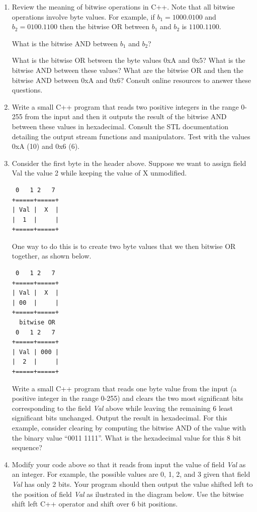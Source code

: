 \documentclass[12pt]{book}
\begin{document}
\begin{enumerate}[resume*]
\item Review the meaning of bitwise operations in C++. Note that all bitwise operations involve byte values. For example, if $b_1 = 1000.0100$ and $b_2 = 0100.1100$ then the bitwise OR between $b_1$ and $b_2$ is $1100.1100$.

  What is the bitwise AND between $b_1$ and $b_2$?

  What is the bitwise OR between the byte values 0xA and 0x5? What is the bitwise AND between these values? What are the bitwise OR and then the bitwise AND between 0xA and 0x6? Consult online resources to answer these questions.

\item Write a small C++ program that reads two positive integers in the range 0-255 from the input and then it outputs the result of the bitwise AND between these values in hexadecimal. Consult the STL documentation detailing the output stream functions and manipulators. Test with the values 0xA (10) and 0x6 (6).
  
\item Consider the first byte in the header above. Suppose we want to assign  field Val the value 2 while keeping the value of X unmodified.

\begin{verbatim}
 0   1 2   7 
+=====+=====+
| Val |  X  |
|  1  |     |
+=====+=====+
\end{verbatim}

  One way to do this is to create two byte values that we then bitwise OR together, as shown below.

\begin{verbatim}
 0   1 2   7 
+=====+=====+
| Val |  X  |
| 00  |     |
+=====+=====+
  bitwise OR
 0   1 2   7 
+=====+=====+
| Val | 000 |
|  2  |     |
+=====+=====+
\end{verbatim}

Write a small C++ program that reads one byte value from the input (a positive integer in the range 0-255) and clears the two most significant bits corresponding to the field \emph{Val} above while leaving the remaining 6 least significant bits unchanged. Output the result in hexadecimal. For this example, consider clearing by computing the bitwise AND of the value with the binary value ``0011 1111''. What is the hexadecimal value for this 8 bit sequence?

\item Modify your code above so that it reads from input the value of field \emph{Val} as an integer. For example, the possible values are 0, 1, 2, and 3 given that field \emph{Val} has only 2 bits. Your program should then output the value shifted left to the position of field \emph{Val} as ilustrated in the diagram below. Use the bitwise shift left C++ operator and shift over 6 bit positions.


\end{enumerate}
\end{document}

